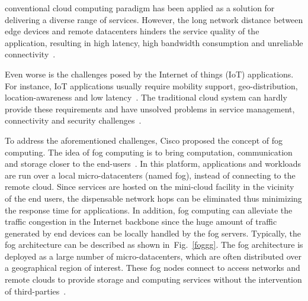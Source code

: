 \documentclass[10pt,journal,compsoc]{IEEEtran}
\newcommand{\Fig}[1]{Fig.~\ref{#1}}
\begin{document}
% 
% 
% 
% 
 conventional cloud computing paradigm has been applied as a solution for delivering a diverse range of services. However, the long network distance between edge devices and remote datacenters hinders the service quality of the application, resulting in high latency, high bandwidth consumption and unreliable connectivity~\cite{Vaquero:2014:FYW:2677046.2677052}. 

Even worse is the challenges posed by the Internet of things (IoT) applications. For instance, IoT applications usually require mobility support, geo-distribution, location-awareness and low latency~\cite{bonomi2014fog}. The traditional cloud system can hardly provide these requirements and have unsolved problems in service management, connectivity and security challenges~\cite{yi2015survey}. 

To address the aforementioned challenges, Cisco proposed the concept of fog computing. The idea of fog computing is to bring computation, communication and storage closer to the end-users~\cite{yi2015survey}. In this platform, applications and workloads are run over a local micro-datacenters (named fog), instead of connecting to the remote cloud. Since services are hosted on the mini-cloud facility in the vicinity of the end users, the dispensable network hops can be eliminated thus minimizing the response time for applications. In addition, fog computing can alleviate the traffic congestion in the Internet backbone since the huge amount of traffic generated by end devices can be locally handled by the fog servers. Typically, the fog architecture can be described as shown in~\Fig{foggg}. The fog architecture is deployed as a large number of micro-datacenters, which are often distributed over a geographical region of interest. These fog nodes connect to access networks and remote clouds to provide storage and computing services without the intervention of third-parties~\cite{chiang2016fog}.
\end{document}
